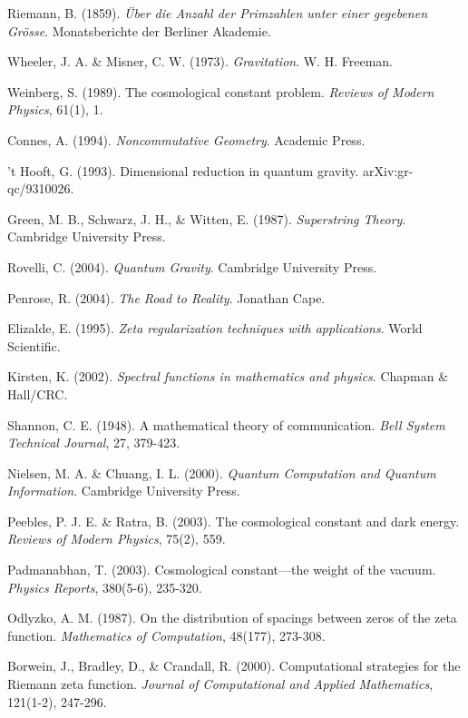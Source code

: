 \documentclass[12pt,a4paper]{article}
\begin{document}
\begin{thebibliography}{99}

Riemann, B. (1859).
\textit{Über die Anzahl der Primzahlen unter einer gegebenen Grösse}.
Monatsberichte der Berliner Akademie.

Wheeler, J. A. \& Misner, C. W. (1973).
\textit{Gravitation}.
W. H. Freeman.

Weinberg, S. (1989).
The cosmological constant problem.
\textit{Reviews of Modern Physics}, 61(1), 1.

Connes, A. (1994).
\textit{Noncommutative Geometry}.
Academic Press.

't Hooft, G. (1993).
Dimensional reduction in quantum gravity.
arXiv:gr-qc/9310026.

Green, M. B., Schwarz, J. H., \& Witten, E. (1987).
\textit{Superstring Theory}.
Cambridge University Press.

Rovelli, C. (2004).
\textit{Quantum Gravity}.
Cambridge University Press.

Penrose, R. (2004).
\textit{The Road to Reality}.
Jonathan Cape.

Elizalde, E. (1995).
\textit{Zeta regularization techniques with applications}.
World Scientific.

Kirsten, K. (2002).
\textit{Spectral functions in mathematics and physics}.
Chapman \& Hall/CRC.

Shannon, C. E. (1948).
A mathematical theory of communication.
\textit{Bell System Technical Journal}, 27, 379-423.

Nielsen, M. A. \& Chuang, I. L. (2000).
\textit{Quantum Computation and Quantum Information}.
Cambridge University Press.

Peebles, P. J. E. \& Ratra, B. (2003).
The cosmological constant and dark energy.
\textit{Reviews of Modern Physics}, 75(2), 559.

Padmanabhan, T. (2003).
Cosmological constant—the weight of the vacuum.
\textit{Physics Reports}, 380(5-6), 235-320.

Odlyzko, A. M. (1987).
On the distribution of spacings between zeros of the zeta function.
\textit{Mathematics of Computation}, 48(177), 273-308.

Borwein, J., Bradley, D., \& Crandall, R. (2000).
Computational strategies for the Riemann zeta function.
\textit{Journal of Computational and Applied Mathematics}, 121(1-2), 247-296.


\end{thebibliography}
\end{document}
